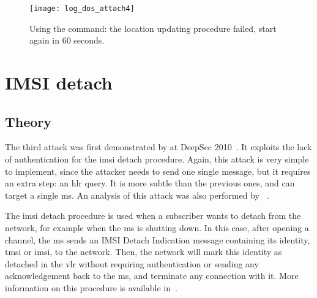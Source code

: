       \iffalse
      \begin{figure}
        \centering
        \texttt{[image: log\_dos\_attach3]}
        \caption{Using the \prog{dos attach} command: the connection is
          aborted as soon as any message is received.\fxnote{Should wait
            until rejected actually, so that the vlr does some work.}}
        \label{fig:log_dos_attach3}
      \end{figure}
      \fi

      \begin{figure}
        \centering
        \texttt{[image: log\_dos\_attach4]}
        \caption{Using the  command: the location updating procedure failed, start again in
        60 seconds.}
        \label{fig:log_dos_attach4}
      \end{figure}


    \section{IMSI detach}

      \subsection{Theory}

      The third attack was first demonstrated by 
      at DeepSec 2010~\cite{munaut_cheap_2010}. It exploits the lack of
      authentication for the \gls{imsi} detach procedure. Again, this
      attack is very simple to implement, since the attacker needs to
      send one single message, but it requires an extra step: an
      \gls{hlr} query. It is more subtle than the previous ones, and can
      target a single \gls{ms}. An analysis of this attack was also
      performed by ~\cite{recas_de_buen_security_2011}.

      The \gls{imsi} detach procedure is used when a subscriber wants to
      detach from the network, for example when the \gls{ms} is shutting
      down. In this case, after opening a channel, the \gls{ms} sends an
      IMSI Detach Indication message containing its identity, \gls{tmsi}
      or \gls{imsi}, to the network. Then, the network will mark this
      identity as detached in the \gls{vlr} without requiring
      authentication or sending any acknowledgement back to the
      \gls{ms}, and terminate any connection with it. More information
      on this procedure is available in~.

